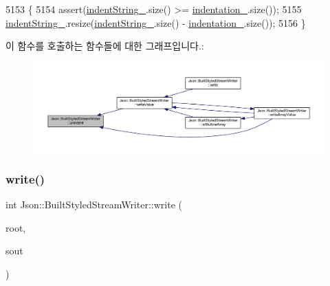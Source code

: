 \begin{DoxyCode}
5153                                        \{
5154   assert(\hyperlink{struct_json_1_1_built_styled_stream_writer_a0f8115a4fb474ab0e9de25f10e5ca09a}{indentString\_}.size() >= \hyperlink{struct_json_1_1_built_styled_stream_writer_aaa4cbad91428ceca37cbabfc2a17a92d}{indentation\_}.size());
5155   \hyperlink{struct_json_1_1_built_styled_stream_writer_a0f8115a4fb474ab0e9de25f10e5ca09a}{indentString\_}.resize(\hyperlink{struct_json_1_1_built_styled_stream_writer_a0f8115a4fb474ab0e9de25f10e5ca09a}{indentString\_}.size() - 
      \hyperlink{struct_json_1_1_built_styled_stream_writer_aaa4cbad91428ceca37cbabfc2a17a92d}{indentation\_}.size());
5156 \}
\end{DoxyCode}
이 함수를 호출하는 함수들에 대한 그래프입니다.\+:\nopagebreak
\begin{figure}[H]
\begin{center}
\leavevmode
\includegraphics[width=350pt]{struct_json_1_1_built_styled_stream_writer_a0da6c6f603e00c8c6e38af553edd8c55_icgraph}
\end{center}
\end{figure}
\mbox{\label{struct_json_1_1_built_styled_stream_writer_a823cdb1afabb6b0d5f39bcd5a6a6f747}} 
\subsubsection{\texorpdfstring{write()}{write()}}
{\footnotesize\ttfamily int Json\+::\+Built\+Styled\+Stream\+Writer\+::write (\begin{DoxyParamCaption}\item[{\hyperlink{class_json_1_1_value}{Value} const \&}]{root,  }\item[{\hyperlink{json_8h_a37a25be5fca174927780caeb280094ce}{J\+S\+O\+N\+C\+P\+P\+\_\+\+O\+S\+T\+R\+E\+AM} $\ast$}]{sout }\end{DoxyParamCaption})\hspace{0.3cm}{\ttfamily [virtual]}}

